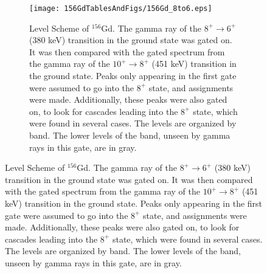 \begin{figure}[!]
    \centering
    \begin{subfigure}{\textwidth}
    \texttt{[image: 156GdTablesAndFigs/156Gd\_8to6.eps]}
    \caption{\label{fig:156_8to6level}Level Scheme of $^{156}$Gd. The gamma ray of the $8^+\rightarrow6^+$ (380 keV) transition in the ground state was gated on. It was then compared with the gated spectrum from the gamma ray of the $10^+\rightarrow8^+$ (451 keV) transition in the ground state. Peaks only appearing in the first gate were assumed to go into the $8^+$ state, and assignments were made. Additionally, these peaks were also gated on, to look for cascades leading into the $8^+$ state, which were found in several cases. The levels are organized by band. The lower levels of the band, unseen by gamma rays in this gate, are in gray.}
    \end{subfigure}
    \label{fig:156_8to6}
    \end{figure}
